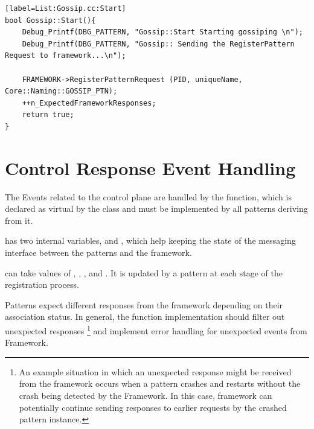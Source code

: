 \begin{lstlisting}[style=boralargefile][label=List:Gossip.cc:Start]
bool Gossip::Start(){
	Debug_Printf(DBG_PATTERN, "Gossip::Start Starting gossiping \n");
	Debug_Printf(DBG_PATTERN, "Gossip:: Sending the RegisterPattern Request to framework...\n");

	FRAMEWORK->RegisterPatternRequest (PID, uniqueName, Core::Naming::GOSSIP_PTN);
	++n_ExpectedFrameworkResponses;
	return true;
}
\end{lstlisting}


\section {Control Response Event Handling} \label{sec:ControlResponseEvent}

The Events related to the control plane are handled by the   function, which is declared as virtual by the  class and must be implemented by all patterns deriving from it. 

 has two internal variables,  and , which help keeping the state of the messaging interface between the patterns and the framework.  

 can take values of 
,
,
, and
. 
It is updated by a pattern at each stage of the registration process.


Patterns expect different responses from the framework depending on their association status. 
In general, the 
 function implementation should filter out unexpected responses%
\footnote{
An example situation in which an unexpected response might be received from the framework occurs when a pattern crashes and restarts without the crash being detected by the Framework.  
In this case, framework can potentially continue sending responses to earlier requests by the crashed pattern instance.}
and implement error handling for unexpected events from Framework. 

